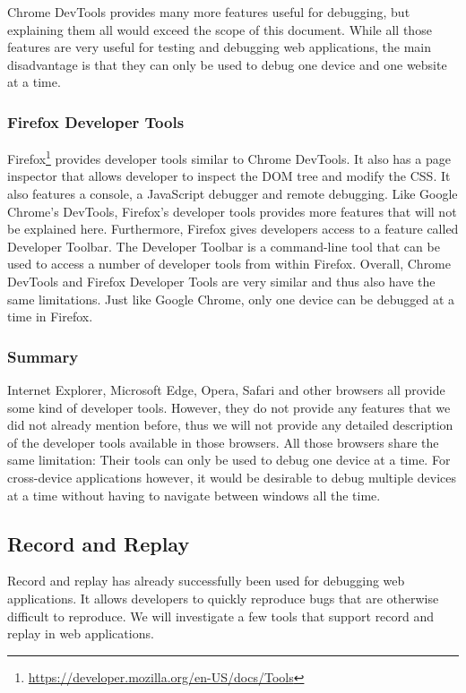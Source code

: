 Chrome DevTools provides many more features useful for debugging, but explaining them all would exceed the scope of this document. While all those features are very useful for testing and debugging web applications, the main disadvantage is that they can only be used to debug one device and one website at a time.

\subsubsection{Firefox Developer Tools}

Firefox\footnote{\url{https://developer.mozilla.org/en-US/docs/Tools}} provides developer tools similar to Chrome DevTools. It also has a page inspector that allows developer to inspect the DOM tree and modify the CSS. It also features a console, a JavaScript debugger and remote debugging. Like Google Chrome's DevTools, Firefox's developer tools provides more features that will not be explained here. Furthermore, Firefox gives developers access to a feature called Developer Toolbar. The Developer Toolbar is a command-line tool that can be used to access a number of developer tools from within Firefox. Overall, Chrome DevTools and Firefox Developer Tools are very similar and thus also have the same limitations. Just like Google Chrome, only one device can be debugged at a time in Firefox.

\subsubsection{Summary}

Internet Explorer, Microsoft Edge, Opera, Safari and other browsers all provide some kind of developer tools. However, they do not provide any features that we did not already mention before, thus we will not provide any detailed description of the developer tools available in those browsers. All those browsers share the same limitation: Their tools can only be used to debug one device at a time. For cross-device applications however, it would be desirable to debug multiple devices at a time without having to navigate between windows all the time.

\subsection{Record and Replay}

Record and replay has already successfully been used for debugging web applications. It allows developers to quickly reproduce bugs that are otherwise difficult to reproduce. We will investigate a few tools that support record and replay in web applications.

